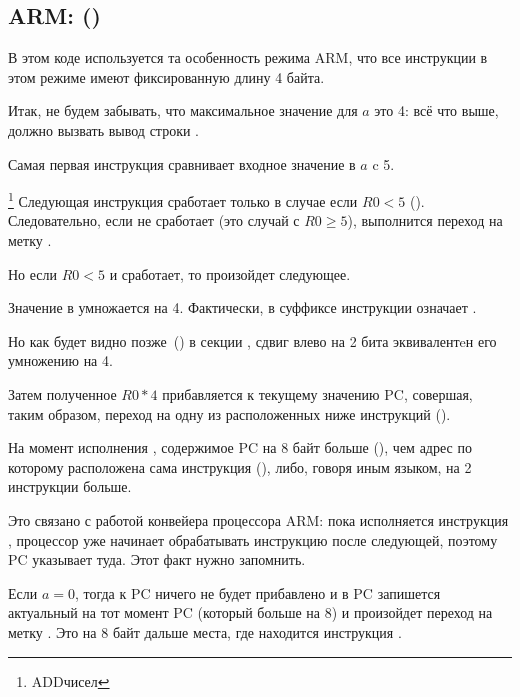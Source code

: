 \subsection{ARM: \OptimizingKeilVI (\ARMMode)}
\label{sec:SwitchARMLot}



В этом коде используется та особенность режима ARM, 
что все инструкции в этом режиме имеют фиксированную длину 4 байта.

Итак, не будем забывать, что максимальное значение для $a$ это 4: всё что выше, должно вызвать
вывод строки .

Самая первая инструкция  сравнивает входное значение в $a$ c 5.

\footnote{ADD чисел}
Следующая инструкция  сработает только в случае если $R0 < 5$ (). 
Следовательно, если  не сработает (это случай с $R0 \geq 5$), выполнится переход на метку 
.

Но если $R0 < 5$ и  сработает, то произойдет следующее.

Значение в  умножается на 4.
Фактически,  в суффиксе инструкции означает .

Но как будет видно позже~() в секции \q{\ShiftsSectionName}, 
сдвиг влево на 2 бита эквивалентeн его умножению на 4.

Затем полученное $R0*4$ прибавляется к текущему значению \ac{PC}, 
совершая, таким образом, переход на одну из расположенных ниже инструкций  ().

На момент исполнения ,
содержимое \ac{PC} на 8 байт больше (), чем адрес по которому расположена сама инструкция  (), 
либо, говоря иным языком, на 2 инструкции больше.

Это связано с работой конвейера процессора ARM:
пока исполняется инструкция , процессор уже начинает обрабатывать инструкцию после следующей, 
поэтому \ac{PC} указывает туда. Этот факт нужно запомнить.

Если $a=0$, тогда к \ac{PC} ничего не будет прибавлено и 
в \ac{PC} запишется актуальный на тот момент \ac{PC} (который больше на 8) 
и произойдет переход на метку . 
Это на 8 байт дальше места, где находится инструкция .

